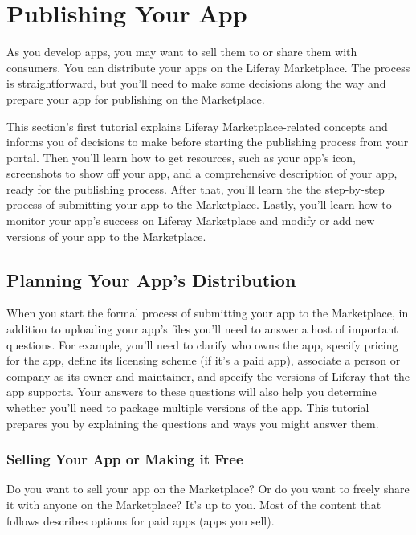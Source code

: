 \chapter{Publishing Your App}\label{publishing-your-app}

As you develop apps, you may want to sell them to or share them with
consumers. You can distribute your apps on the Liferay Marketplace. The
process is straightforward, but you'll need to make some decisions along
the way and prepare your app for publishing on the Marketplace.

This section's first tutorial explains Liferay Marketplace-related
concepts and informs you of decisions to make before starting the
publishing process from your portal. Then you'll learn how to get
resources, such as your app's icon, screenshots to show off your app,
and a comprehensive description of your app, ready for the publishing
process. After that, you'll learn the the step-by-step process of
submitting your app to the Marketplace. Lastly, you'll learn how to
monitor your app's success on Liferay Marketplace and modify or add new
versions of your app to the Marketplace.

\section{Planning Your App's
Distribution}\label{planning-your-apps-distribution}

When you start the formal process of submitting your app to the
Marketplace, in addition to uploading your app's files you'll need to
answer a host of important questions. For example, you'll need to
clarify who owns the app, specify pricing for the app, define its
licensing scheme (if it's a paid app), associate a person or company as
its owner and maintainer, and specify the versions of Liferay that the
app supports. Your answers to these questions will also help you
determine whether you'll need to package multiple versions of the app.
This tutorial prepares you by explaining the questions and ways you
might answer them.

\subsection{Selling Your App or Making it
Free}\label{selling-your-app-or-making-it-free}

Do you want to sell your app on the Marketplace? Or do you want to
freely share it with anyone on the Marketplace? It's up to you. Most of
the content that follows describes options for paid apps (apps you
sell).

